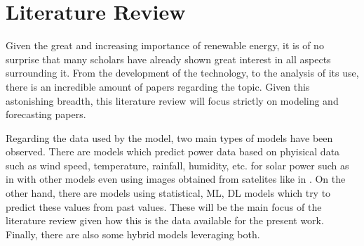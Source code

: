 \section{Literature Review}

Given the great and increasing importance of renewable energy, it is of no surprise that many scholars have already shown great interest in all aspects surrounding it. From the development of the technology, to the analysis of its use, there is an incredible amount of papers regarding the topic. Given this astonishing breadth, this literature review will focus strictly on modeling and forecasting papers.

Regarding the data used by the model, two main types of models have been observed. There are models which predict power data based on phyisical data such as wind speed, temperature, rainfall, humidity, etc. for solar power such as in \cite{wang_urquhart_kleissl_2019} with other models even using images obtained from satelites like in \cite{shen_yao_wen_he_jiang_2018}. On the other hand, there are models using statistical, ML, DL models which try to predict these values from past values. These will be the main focus of the literature review given how this is the data available for the present work. Finally, there are also some hybrid models leveraging both.  


